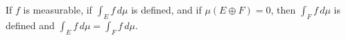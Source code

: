 If $f$ is measurable, if $\int_E f \, d\mu$ is defined, and if $\mu(E \oplus F) = 0$, then $\int_F f \, d\mu$ is defined and $\int_E f \, d\mu = \int_F f \, d\mu$.

